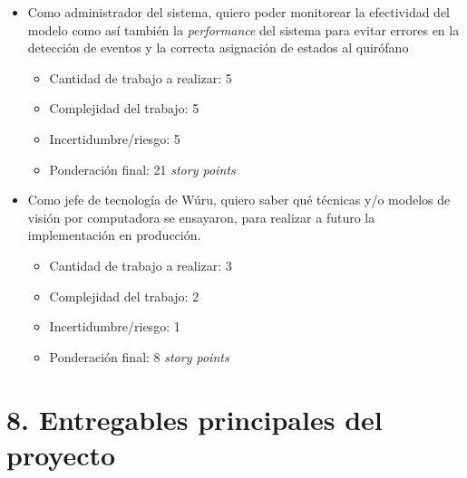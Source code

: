 \documentclass[
11pt, %
]{charter}
\begin{document}
\begin{itemize}
	\item Como administrador del sistema, quiero poder monitorear la efectividad del modelo como así también la \textit{performance} del sistema para evitar errores en la detección de eventos y la correcta asignación de estados al quirófano
	\begin{itemize}
		\item Cantidad de trabajo a realizar: 5
		\item Complejidad del trabajo: 5
		\item Incertidumbre/riesgo: 5
		\item Ponderación final: 21 \textit{story points}
	\end{itemize}
\end{itemize}

\begin{itemize}
	\item Como jefe de tecnología de Wúru, quiero saber qué técnicas y/o modelos
	de visión por computadora se ensayaron, para realizar a futuro la implementación en
	producción.
	\begin{itemize}
		\item Cantidad de trabajo a realizar: 3
		\item Complejidad del trabajo: 2
		\item Incertidumbre/riesgo: 1
		\item Ponderación final: 8 \textit{story points}
	\end{itemize}
\end{itemize}


\section{8. Entregables principales del proyecto}
\label{sec:entregables}
\end{document}
